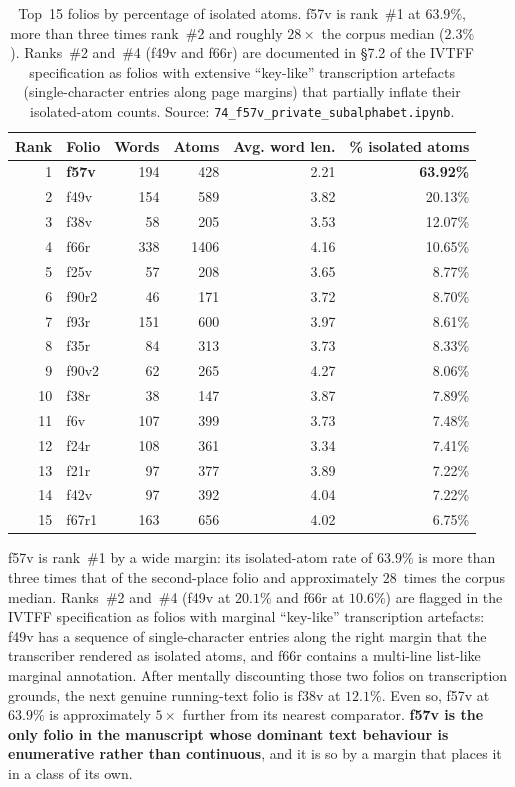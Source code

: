 \begin{table}[h]
\centering
\small
\begin{tabular}{rlrrrr}
\toprule
Rank & Folio & Words & Atoms & Avg. word len. & \% isolated atoms \\
\midrule
1  & \textbf{f57v}  & 194 & 428  & 2.21 & \textbf{63.92\%} \\
2  & f49v   & 154 & 589  & 3.82 & 20.13\% \\
3  & f38v   & 58  & 205  & 3.53 & 12.07\% \\
4  & f66r   & 338 & 1406 & 4.16 & 10.65\% \\
5  & f25v   & 57  & 208  & 3.65 & 8.77\% \\
6  & f90r2  & 46  & 171  & 3.72 & 8.70\% \\
7  & f93r   & 151 & 600  & 3.97 & 8.61\% \\
8  & f35r   & 84  & 313  & 3.73 & 8.33\% \\
9  & f90v2  & 62  & 265  & 4.27 & 8.06\% \\
10 & f38r   & 38  & 147  & 3.87 & 7.89\% \\
11 & f6v    & 107 & 399  & 3.73 & 7.48\% \\
12 & f24r   & 108 & 361  & 3.34 & 7.41\% \\
13 & f21r   & 97  & 377  & 3.89 & 7.22\% \\
14 & f42v   & 97  & 392  & 4.04 & 7.22\% \\
15 & f67r1  & 163 & 656  & 4.02 & 6.75\% \\
\bottomrule
\end{tabular}
\caption{Top~15 folios by percentage of isolated atoms. f57v is rank~\#1 at
$63.9\%$, more than three times rank~\#2 and roughly $28\times$ the corpus
median ($2.3\%$). Ranks~\#2 and~\#4 (f49v and f66r) are documented in
\S7.2 of the IVTFF specification \citep{zandbergen_ivtff} as folios with
extensive ``key-like'' transcription artefacts (single-character entries
along page margins) that partially inflate their isolated-atom counts.
Source: \texttt{74\_f57v\_private\_subalphabet.ipynb}.}
\label{tab:ranking}
\end{table}

f57v is rank~\#1 by a wide margin: its isolated-atom rate of $63.9\%$ is
more than three times that of the second-place folio and approximately
$28$~times the corpus median. Ranks~\#2 and~\#4 (f49v at $20.1\%$ and f66r
at $10.6\%$) are flagged in the IVTFF specification \citep{zandbergen_ivtff}
as folios with marginal ``key-like'' transcription artefacts: f49v has a
sequence of single-character entries along the right margin that the
transcriber rendered as isolated atoms, and f66r contains a multi-line
list-like marginal annotation. After mentally discounting those two folios
on transcription grounds, the next genuine running-text folio is f38v at
$12.1\%$. Even so, f57v at $63.9\%$ is approximately $5\times$ further from
its nearest comparator. \textbf{f57v is the only folio in the manuscript
whose dominant text behaviour is enumerative rather than continuous}, and it
is so by a margin that places it in a class of its own.

